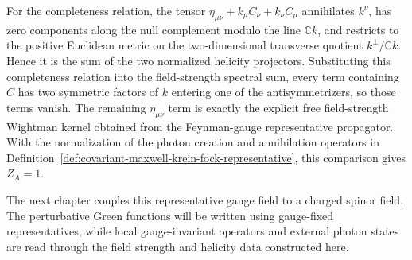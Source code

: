 For the completeness relation, the tensor
\(\eta_{\mu\nu}+k_\mu C_\nu+k_\nu C_\mu\) annihilates \(k^\nu\), has zero
components along the null complement modulo the line \(\mathbb Ck\), and
restricts to the positive Euclidean metric on the two-dimensional transverse
quotient \(k^\perp/\mathbb Ck\).  Hence it is the sum of the two normalized
helicity projectors.  Substituting this completeness relation into the
field-strength spectral sum, every term containing \(C\) has two symmetric
factors of \(k\) entering one of the antisymmetrizers, so those terms vanish.
The remaining \(\eta_{\mu\nu}\) term is exactly the explicit free
field-strength Wightman kernel obtained from the Feynman-gauge representative
propagator.  With the normalization of the photon creation and annihilation
operators in Definition~\ref{def:covariant-maxwell-krein-fock-representative},
this comparison gives \(Z_A=1\).

The next chapter couples this representative gauge field to a charged spinor
field. The perturbative Green functions will be written using gauge-fixed
representatives, while local gauge-invariant operators and external photon
states are read through the field strength and helicity data constructed
here.
